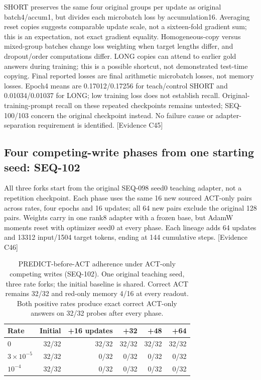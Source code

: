 \documentclass[11pt]{article}
\newcommand{\ev}[1]{\textsf{[Evidence #1]}}
\begin{document}
SHORT preserves the same four original groups per update as original batch4/accum1,
but divides each microbatch loss by accumulation16. Averaging reset copies suggests
comparable update scale, not a sixteen-fold gradient sum; this is an expectation,
not exact gradient equality. Homogeneous-copy versus mixed-group batches change
loss weighting when target lengths differ, and dropout/order computations differ.
LONG copies can attend to earlier gold answers during training; this is a possible
shortcut, not demonstrated test-time copying. Final reported losses are final
arithmetic microbatch losses, not memory losses. Epoch4 means are 0.17012/0.17256
for teach/control SHORT and 0.01034/0.01037 for LONG; low training loss does not
establish recall. Original-training-prompt recall on these repeated checkpoints
remains untested; SEQ-100/103 concern the original checkpoint instead. No failure
cause or adapter-separation requirement is identified. \ev{C45}

\subsection{Four competing-write phases from one starting seed: SEQ-102}
All three forks start from the original SEQ-098 seed0 teaching adapter, not a
repetition checkpoint. Each phase uses the same 16 new sourced ACT-only pairs
across rates, four epochs and 16 updates; all 64 new pairs exclude the original
128 pairs. Weights carry in one rank8 adapter with a frozen base, but AdamW
moments reset with optimizer seed0 at every phase. Each lineage adds 64 updates
and 13312 input/1504 target tokens, ending at 144 cumulative steps. \ev{C46}

\begin{table}[t]
\centering
\small
\begin{tabular}{lrrrrr}
\toprule
Rate & Initial & +16 updates & +32 & +48 & +64 \\
\midrule
0 & 32/32 & 32/32 & 32/32 & 32/32 & 32/32 \\
$3\times10^{-5}$ & 32/32 & 0/32 & 0/32 & 0/32 & 0/32 \\
$10^{-4}$ & 32/32 & 0/32 & 0/32 & 0/32 & 0/32 \\
\bottomrule
\end{tabular}
\caption{PREDICT-before-ACT adherence under ACT-only competing writes (SEQ-102).
One original teaching seed, three rate forks; the initial baseline is shared.
Correct ACT remains 32/32 and red-only memory 4/16 at every readout. Both positive
rates produce exact correct ACT-only answers on 32/32 probes after every phase.}
\label{tab:fading102}
\end{table}
\end{document}
